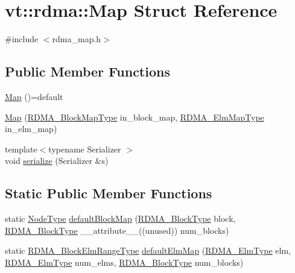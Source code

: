 \hypertarget{structvt_1_1rdma_1_1_map}{}\section{vt\+:\+:rdma\+:\+:Map Struct Reference}
\label{structvt_1_1rdma_1_1_map}


{\ttfamily \#include $<$rdma\+\_\+map.\+h$>$}

\subsection*{Public Member Functions}
\begin{DoxyCompactItemize}
\item 
\hyperlink{structvt_1_1rdma_1_1_map_a20781151e2a256532d75bda5d42f4685}{Map} ()=default
\item 
\hyperlink{structvt_1_1rdma_1_1_map_aa87802218cedbb5485a286199eed3489}{Map} (\hyperlink{namespacevt_1_1rdma_a049e294a5236ad30692253d5f82886c9}{R\+D\+M\+A\+\_\+\+Block\+Map\+Type} in\+\_\+block\+\_\+map, \hyperlink{namespacevt_1_1rdma_a6798ab36a5dcb8749c25dff719f9ce07}{R\+D\+M\+A\+\_\+\+Elm\+Map\+Type} in\+\_\+elm\+\_\+map)
\item 
{\footnotesize template$<$typename Serializer $>$ }\\void \hyperlink{structvt_1_1rdma_1_1_map_a303a71e8ea3386768be41e8bfe5c9e9a}{serialize} (Serializer \&s)
\end{DoxyCompactItemize}
\subsection*{Static Public Member Functions}
\begin{DoxyCompactItemize}
\item 
static \hyperlink{namespacevt_a866da9d0efc19c0a1ce79e9e492f47e2}{Node\+Type} \hyperlink{structvt_1_1rdma_1_1_map_a8a37b9b72187246a37d025be09e7f6c5}{default\+Block\+Map} (\hyperlink{namespacevt_ae54d2ca8f6bb4d65faf65118c82cd6f7}{R\+D\+M\+A\+\_\+\+Block\+Type} block, \hyperlink{namespacevt_ae54d2ca8f6bb4d65faf65118c82cd6f7}{R\+D\+M\+A\+\_\+\+Block\+Type} \+\_\+\+\_\+attribute\+\_\+\+\_\+((unused)) num\+\_\+blocks)
\item 
static \hyperlink{namespacevt_1_1rdma_a8320f97b4a2866df60d9778486dbcd0f}{R\+D\+M\+A\+\_\+\+Block\+Elm\+Range\+Type} \hyperlink{structvt_1_1rdma_1_1_map_aebbab4065afa91396bd259001fbd4744}{default\+Elm\+Map} (\hyperlink{namespacevt_a2c2a902092b72056f70210c159f966f0}{R\+D\+M\+A\+\_\+\+Elm\+Type} elm, \hyperlink{namespacevt_a2c2a902092b72056f70210c159f966f0}{R\+D\+M\+A\+\_\+\+Elm\+Type} num\+\_\+elms, \hyperlink{namespacevt_ae54d2ca8f6bb4d65faf65118c82cd6f7}{R\+D\+M\+A\+\_\+\+Block\+Type} num\+\_\+blocks)
\end{DoxyCompactItemize}
